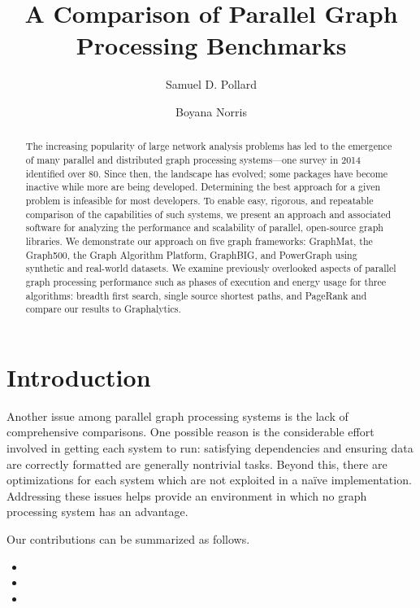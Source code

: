 \documentclass{llncs}
\begin{document}
\title{A Comparison of Parallel Graph Processing Benchmarks}
\author{Samuel D. Pollard \and Boyana Norris}
\maketitle
\begin{abstract}
The increasing popularity of large network analysis problems has led to the emergence of many parallel and distributed graph processing systems---one survey in 2014 identified over 80. Since then, the landscape has evolved; some packages have become inactive while more are being developed. Determining the best approach for a given problem is infeasible for most developers. To enable easy, rigorous, and repeatable comparison of the capabilities of such systems, we present an approach and associated software for analyzing the performance and scalability of parallel, open-source graph libraries. We demonstrate our approach on five graph frameworks: GraphMat, the Graph500, the Graph Algorithm Platform, GraphBIG, and PowerGraph using synthetic and real-world datasets. We examine previously overlooked aspects of parallel graph processing performance such as phases of execution and energy usage for three algorithms: breadth first search, single source shortest paths, and PageRank and compare our results to Graphalytics.
\end{abstract}

\section{Introduction}


Another issue among parallel graph processing systems is the lack of comprehensive comparisons. One possible reason is the considerable effort involved in getting each system to run: satisfying dependencies and ensuring data are correctly formatted are generally nontrivial tasks. Beyond this, there are optimizations for each system which are not exploited in a na\"ive implementation. Addressing these issues helps provide an environment in which no graph processing system has an advantage.




Our contributions can be summarized as follows.
\begin{itemize}
\item
\item
\item
\end{itemize}
\end{document}
